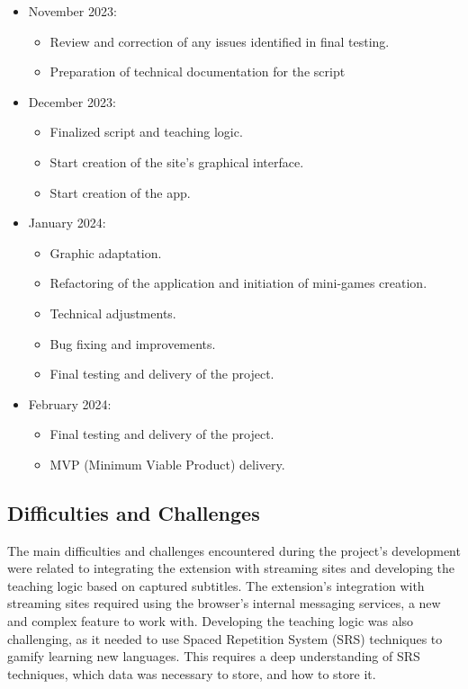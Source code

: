 \documentclass[12pt]{article}
\begin{document}
\begin{itemize}
\item November 2023:
\begin{itemize}
\item Review and correction of any issues identified in final testing.
\item Preparation of technical documentation for the script 
\end{itemize}

\item December 2023:
\begin{itemize}
\item Finalized script and teaching logic.
\item Start creation of the site's graphical interface.
\item Start creation of the app. 
\end{itemize}

\item January 2024:
\begin {itemize}
\item Graphic adaptation.
\item Refactoring of the application and initiation of mini-games creation.
\item Technical adjustments.
\item Bug fixing and improvements.
\item Final testing and delivery of the project.
\end {itemize}

\item February 2024:
\begin {itemize}
\item Final testing and delivery of the project.
\item MVP (Minimum Viable Product) delivery.
\end {itemize}

\end{itemize}

\subsection{Difficulties and Challenges}

The main difficulties and challenges encountered during the project's development were related to integrating the extension with streaming sites and developing the teaching logic based on captured subtitles. The extension's integration with streaming sites required using the browser's internal messaging services, a new and complex feature to work with. Developing the teaching logic was also challenging, as it needed to use Spaced Repetition System (SRS) techniques to gamify learning new languages. This requires a deep understanding of SRS techniques, which data was necessary to store, and how to store it. 
\end{document}
